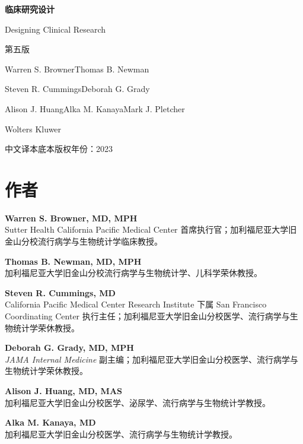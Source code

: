 \hypersetup{pageanchor=false}
\begin{titlepage}
\centering
\vspace*{25mm}
{\Huge\bfseries\heiti\color{dcrteal}临床研究设计\par}
\vspace{8mm}
{\LARGE Designing Clinical Research\par}
\vspace{7mm}
{\Large 第五版\par}
\vspace{18mm}
{\large Warren S. Browner\quad Thomas B. Newman\par
Steven R. Cummings\quad Deborah G. Grady\par
Alison J. Huang\quad Alka M. Kanaya\quad Mark J. Pletcher\par}
\vfill
{\large Wolters Kluwer\par}
\vspace{8mm}
{\small 中文译本\quad 底本版权年份：2023\par}
\end{titlepage}
\hypersetup{pageanchor=true}
\chapter*{作者}
\begingroup\small
\noindent\textbf{Warren S. Browner, MD, MPH}\\
Sutter Health California Pacific Medical Center 首席执行官；加利福尼亚大学旧金山分校流行病学与生物统计学临床教授。

\noindent\textbf{Thomas B. Newman, MD, MPH}\\
加利福尼亚大学旧金山分校流行病学与生物统计学、儿科学荣休教授。

\noindent\textbf{Steven R. Cummings, MD}\\
California Pacific Medical Center Research Institute 下属 San Francisco Coordinating Center 执行主任；加利福尼亚大学旧金山分校医学、流行病学与生物统计学荣休教授。

\noindent\textbf{Deborah G. Grady, MD, MPH}\\
\textit{JAMA Internal Medicine} 副主编；加利福尼亚大学旧金山分校医学、流行病学与生物统计学荣休教授。

\noindent\textbf{Alison J. Huang, MD, MAS}\\
加利福尼亚大学旧金山分校医学、泌尿学、流行病学与生物统计学教授。

\noindent\textbf{Alka M. Kanaya, MD}\\
加利福尼亚大学旧金山分校医学、流行病学与生物统计学教授。

